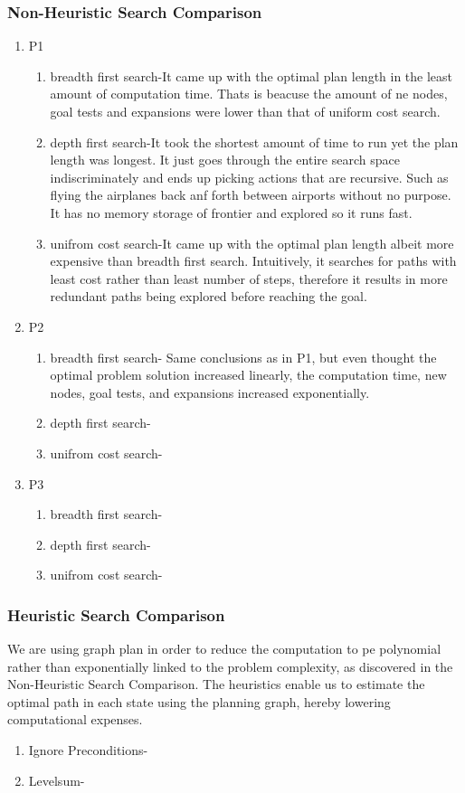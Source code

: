 \documentclass[11pt,a4paper]{report}
\begin{document}
\subsubsection*{ Non-Heuristic Search Comparison }
\begin{enumerate}
	\item  P1
		\begin{enumerate}
		\item breadth first search-It came up with the optimal plan length in the least amount of computation time. Thats is beacuse the amount of ne nodes, goal tests and expansions were lower than that of uniform cost search.
		\item depth first search-It took the shortest amount of time to run yet the plan length was longest. It just goes through the entire search space indiscriminately and ends up picking actions that are recursive. Such as flying the airplanes back anf forth between airports without no purpose. It has no memory storage of frontier and explored so it  runs fast.
		\item unifrom cost search-It came up with the optimal plan length albeit more expensive than breadth first search.  Intuitively, it searches for paths with least cost rather than least number of steps, therefore it results in more redundant paths being explored before reaching the goal.
		\end{enumerate}
	\item P2
		\begin{enumerate}
		\item breadth first search- Same conclusions as in P1, but even thought the optimal problem solution increased linearly, the computation time, new nodes, goal tests, and expansions increased exponentially. 
		\item depth first search-
		\item unifrom cost search-	
		\end{enumerate}
	\item P3
		\begin{enumerate}
		\item breadth first search-
		\item depth first search-
		\item unifrom cost search-
		\end{enumerate}
\end{enumerate}
\subsubsection*{ Heuristic Search Comparison }
We are using graph plan in order to reduce the computation to pe polynomial rather than exponentially linked to the problem complexity, as discovered in the Non-Heuristic Search Comparison. The heuristics enable us to estimate the optimal path in each state using the planning graph, hereby lowering computational expenses.
\begin{enumerate}
	\item Ignore Preconditions-
	\item Levelsum-
\end{enumerate}
\end{document}
